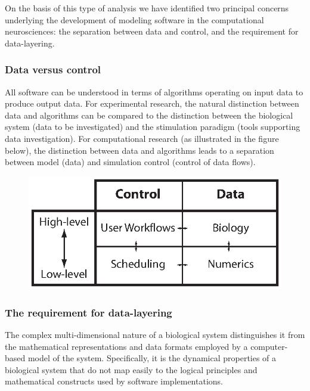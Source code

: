 \documentclass[12pt]{article}
\begin{document}
On the basis of this type of analysis we have identified two principal concerns underlying the development of modeling software in the computational neurosciences: the separation between data and control, and the requirement for data-layering.

\subsubsection*{Data versus control}
\label{sec:data-vs-control}
All software can be understood in terms of algorithms operating on input data to produce output data. For experimental research, the natural distinction between data and algorithms can be compared to the distinction between the biological system (data to be investigated) and the stimulation paradigm (tools supporting data investigation). For computational research (as illustrated in the figure below), the distinction between data and algorithms leads to a separation between model (data) and simulation control (control of data flows). 

\begin{figure}[h]
  \centering
 \includegraphics[scale=0.95]{figures/matrix.eps}
  \label{fig:datacontrol}
\end{figure}

\subsubsection*{The requirement for data-layering}
\label{sec:data-layering}
The complex multi-dimensional nature of a biological system distinguishes it from the mathematical representations and data formats employed by a computer-based model of the system. Specifically, it is the dynamical properties of a biological system that do not map easily to the logical principles and mathematical constructs used by software implementations.
\end{document}
